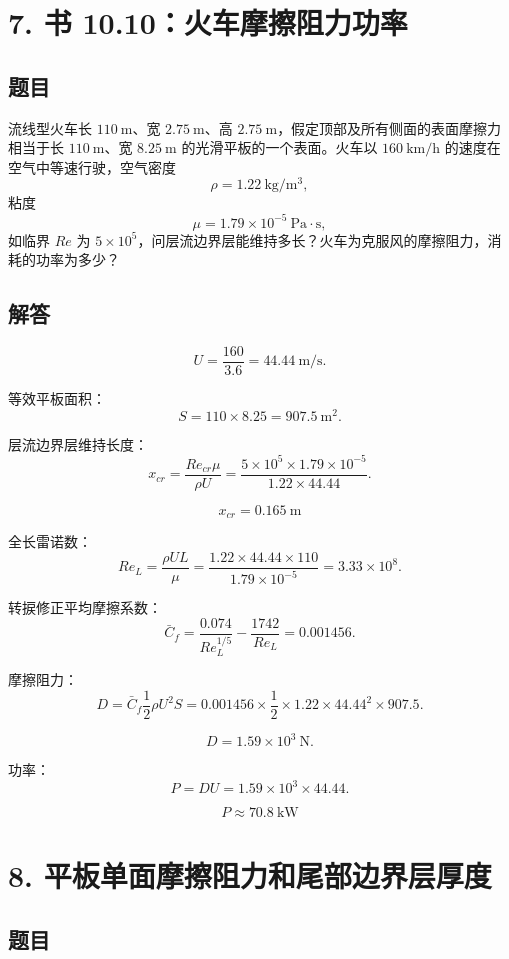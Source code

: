 ﻿\documentclass[11pt,a4paper]{ctexart}
\begin{document}
\section*{7. 书 10.10：火车摩擦阻力功率}

\subsection*{题目}

流线型火车长 \(110\ \mathrm{m}\)、宽 \(2.75\ \mathrm{m}\)、高 \(2.75\ \mathrm{m}\)，假定顶部及所有侧面的表面摩擦力相当于长 \(110\ \mathrm{m}\)、宽 \(8.25\ \mathrm{m}\) 的光滑平板的一个表面。火车以 \(160\ \mathrm{km/h}\) 的速度在空气中等速行驶，空气密度
\[
\rho=1.22\ \mathrm{kg/m^3},
\]
粘度
\[
\mu=1.79\times10^{-5}\ \mathrm{Pa\cdot s},
\]
如临界 \(Re\) 为 \(5\times10^5\)，问层流边界层能维持多长？火车为克服风的摩擦阻力，消耗的功率为多少？

\subsection*{解答}

\[
U=\frac{160}{3.6}=44.44\ \mathrm{m/s}.
\]

等效平板面积：
\[
S=110\times8.25=907.5\ \mathrm{m^2}.
\]

层流边界层维持长度：
\[
x_{cr}=\frac{Re_{cr}\mu}{\rho U}
=\frac{5\times10^5\times1.79\times10^{-5}}{1.22\times44.44}.
\]

\[
\boxed{x_{cr}=0.165\ \mathrm{m}}
\]

全长雷诺数：
\[
Re_L=\frac{\rho UL}{\mu}
=\frac{1.22\times44.44\times110}{1.79\times10^{-5}}
=3.33\times10^8.
\]

转捩修正平均摩擦系数：
\[
\bar C_f=\frac{0.074}{Re_L^{1/5}}-\frac{1742}{Re_L}
=0.001456.
\]

摩擦阻力：
\[
D=\bar C_f\frac12\rho U^2S
=0.001456\times\frac12\times1.22\times44.44^2\times907.5.
\]

\[
D=1.59\times10^3\ \mathrm{N}.
\]

功率：
\[
P=DU=1.59\times10^3\times44.44.
\]

\[
\boxed{P\approx70.8\ \mathrm{kW}}
\]

\section*{8. 平板单面摩擦阻力和尾部边界层厚度}

\subsection*{题目}
\end{document}
